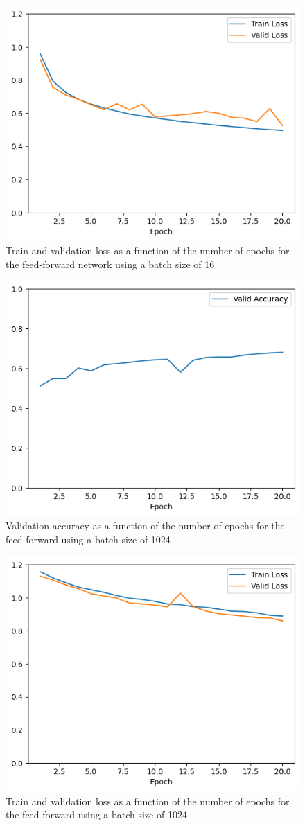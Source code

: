 \documentclass[12pt]{article}
\begin{document}
\begin{itemize}
        \begin{figure}[H]
            \centering
            \includegraphics[width=0.5\linewidth]{../outputs/hw1-q2-2a-loss-16.png}
            \caption{Train and validation loss as a function of the number of epochs for the feed-forward network using a batch size of 16}
            \label{fig:2.2a:loss:16}
        \end{figure}

        \begin{figure}[H]
            \centering
            \includegraphics[width=0.5\linewidth]{../outputs/hw1-q2-2a-acc-1024.png}
            \caption{Validation accuracy as a function of the number of epochs for the feed-forward using a batch size of 1024}
            \label{fig:2.2a:acc:1024}
        \end{figure}

        \begin{figure}[H]
            \centering
            \includegraphics[width=0.5\linewidth]{../outputs/hw1-q2-2a-loss-1024.png}
            \caption{Train and validation loss as a function of the number of epochs for the feed-forward using a batch size of 1024}
            \label{fig:2.2a:loss:1024}
        \end{figure}
\end{itemize}
\end{document}
